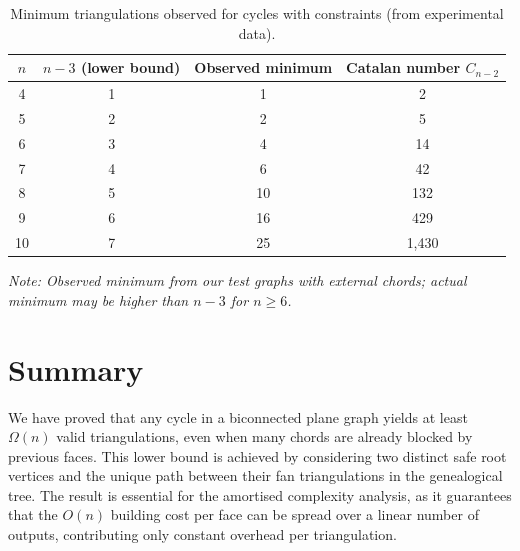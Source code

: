 \begin{table}[htbp]
    \centering
    \caption{Minimum triangulations observed for cycles with constraints (from experimental data).}
    \label{tab:lower_example}
    \begin{tabular}{|c|c|c|c|}
        \hline
        \(n\) & \(n-3\) (lower bound) & Observed minimum & Catalan number \(C_{n-2}\) \\
        \hline
        4 & 1 & 1 & 2 \\
        5 & 2 & 2 & 5 \\
        6 & 3 & 4 & 14 \\
        7 & 4 & 6 & 42 \\
        8 & 5 & 10 & 132 \\
        9 & 6 & 16 & 429 \\
        10 & 7 & 25 & 1,430 \\
        \hline
    \end{tabular}
    \vspace{0.2cm}
    \textit{Note: Observed minimum from our test graphs with external chords; actual minimum may be higher than \(n-3\) for \(n \ge 6\).}
\end{table}

\section{Summary}
\label{sec:lower_summary}

We have proved that any cycle in a biconnected plane graph yields at least \(\Omega(n)\) valid triangulations, even when many chords are already blocked by previous faces. 
This lower bound is achieved by considering two distinct safe root vertices and the unique path between their fan triangulations in the genealogical tree. 
The result is essential for the amortised complexity analysis, as it guarantees that the \(O(n)\) building cost per face can be spread over a linear number of outputs, contributing only constant overhead per triangulation.